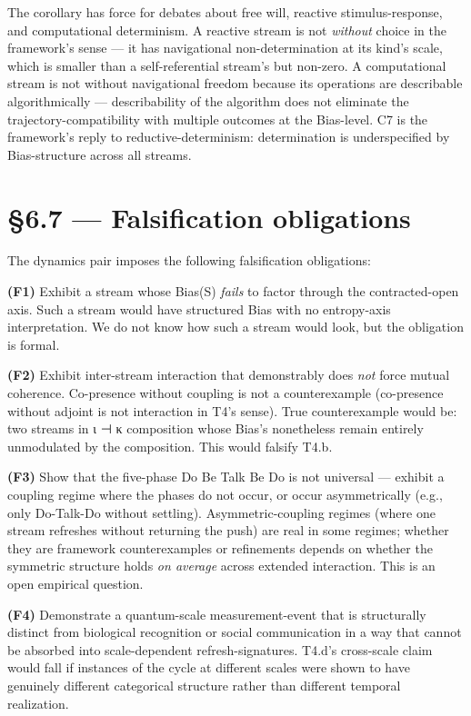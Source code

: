 \documentclass[11pt, openany]{book}
\newcommand{\sectionbreak}{\clearpage}
\begin{document}
The corollary has force for debates about free will, reactive stimulus-response, and computational determinism. A reactive stream is not \textit{without} choice in the framework's sense --- it has navigational non-determination at its kind's scale, which is smaller than a self-referential stream's but non-zero. A computational stream is not without navigational freedom because its operations are describable algorithmically --- describability of the algorithm does not eliminate the trajectory-compatibility with multiple outcomes at the Bias-level. C7 is the framework's reply to reductive-determinism: determination is underspecified by Bias-structure across all streams.

\sectionbreak

\section{§6.7 --- Falsification obligations}

The dynamics pair imposes the following falsification obligations:

\textbf{(F1)} Exhibit a stream whose Bias(S) \textit{fails} to factor through the contracted-open axis. Such a stream would have structured Bias with no entropy-axis interpretation. We do not know how such a stream would look, but the obligation is formal.

\textbf{(F2)} Exhibit inter-stream interaction that demonstrably does \textit{not} force mutual coherence. Co-presence without coupling is not a counterexample (co-presence without adjoint is not interaction in T4's sense). True counterexample would be: two streams in ι ⊣ κ composition whose Bias's nonetheless remain entirely unmodulated by the composition. This would falsify T4.b.

\textbf{(F3)} Show that the five-phase Do Be Talk Be Do is not universal --- exhibit a coupling regime where the phases do not occur, or occur asymmetrically (e.g., only Do-Talk-Do without settling). Asymmetric-coupling regimes (where one stream refreshes without returning the push) are real in some regimes; whether they are framework counterexamples or refinements depends on whether the symmetric structure holds \textit{on average} across extended interaction. This is an open empirical question.

\textbf{(F4)} Demonstrate a quantum-scale measurement-event that is structurally distinct from biological recognition or social communication in a way that cannot be absorbed into scale-dependent refresh-signatures. T4.d's cross-scale claim would fall if instances of the cycle at different scales were shown to have genuinely different categorical structure rather than different temporal realization.
\end{document}
